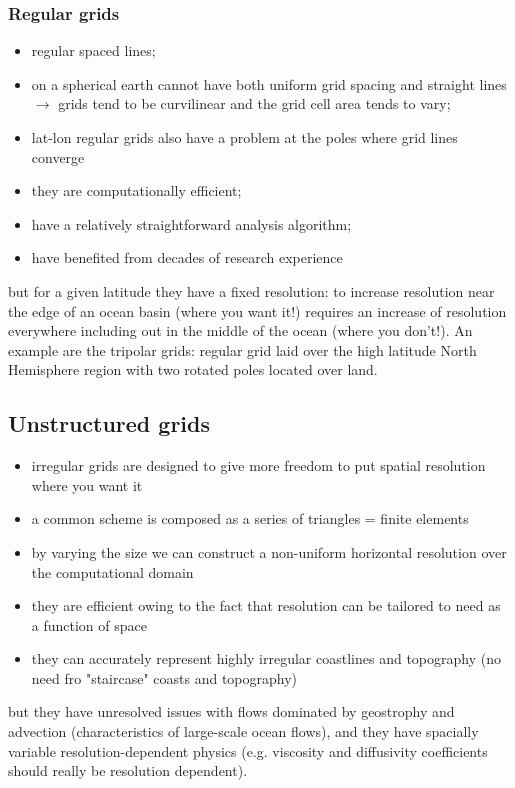 \subsubsection{Regular grids}
\begin{itemize}
	\item regular spaced lines;
	\item on a spherical earth cannot have both uniform grid spacing and straight lines $\rightarrow$ grids tend to be curvilinear and the grid cell area tends to vary;
	\item lat-lon regular grids also have a problem at the poles where grid lines converge
	\item they are computationally efficient;
	\item have a relatively straightforward analysis algorithm;
	\item have benefited from decades of research experience
\end{itemize}
but for a given latitude they have a fixed resolution: to increase resolution near the edge of an ocean basin (where you want it!) requires an increase of resolution everywhere including out in the middle of the ocean (where you don't!). An example are the tripolar grids: regular grid laid over the high latitude North Hemisphere region with two rotated poles located over land.
\subsection{Unstructured grids}
\begin{itemize}
	\item irregular grids are designed to give more freedom to put spatial resolution where you want it
	\item a common scheme is composed as a series of triangles = finite elements
	\item by varying the size we can construct a non-uniform horizontal resolution over the computational domain
	\item they are efficient owing to the fact that resolution can be tailored to need as a function of space
	\item they can accurately represent highly irregular coastlines and topography (no need fro "staircase" coasts and topography)
\end{itemize}
but they have unresolved issues with flows dominated by geostrophy and advection (characteristics of large-scale ocean flows), and they have spacially variable resolution-dependent physics (e.g. viscosity and diffusivity coefficients should really be resolution dependent).
